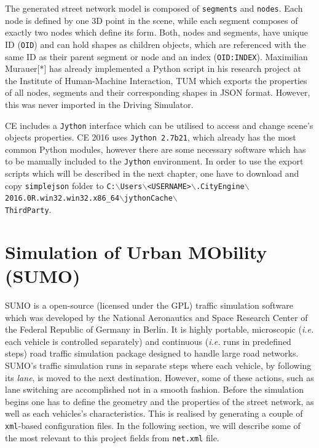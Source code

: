 The generated street network model is composed of \texttt{segments} and \texttt{nodes}. Each node is defined by one 3D point in the scene, while each segment composes of exactly two nodes which define its form. Both, nodes and segments, have unique ID (\texttt{OID}) and can hold shapes as children objects, which are referenced with the same ID as their parent segment or node and an index (\texttt{OID:INDEX}). Maximilian Murauer[*] has already implemented a Python script in his research project at the Institute of Human-Machine Interaction, TUM which exports the properties of all nodes, segments and their corresponding shapes in JSON format. However, this was never imported in the Driving Simulator.

CE includes a \texttt{Jython} interface which can be utilised to access and change scene's objects properties. CE 2016 uses \texttt{Jython 2.7b21}, which already has the most common Python modules, however there are some necessary software which has to be manually included to the \texttt{Jython} environment. In order to use the export scripts which will be described in the next chapter, one have to download and copy \texttt{simplejson} folder to \texttt{C:$\backslash$Users$\backslash$<USERNAME>$\backslash$.CityEngine$\backslash$2016.0R.win32.win32.x86\_64$\backslash$jythonCache$\backslash$\\ThirdParty}.

\section{Simulation of Urban MObility (SUMO)}
\label{ch:sumo}
SUMO is a open-source (licensed under the GPL) traffic simulation software which was developed by the National Aeronautics and Space Research Center of the Federal Republic of Germany in Berlin. It is highly portable, microscopic (\emph{i.e.} each vehicle is controlled separately) and continuous (\emph{i.e.} runs in predefined steps) road traffic simulation package designed to handle large road networks. SUMO's traffic simulation runs in separate steps where each vehicle, by following its \emph{lane}, is moved to the next destination. However, some of these actions, such as lane switching are accomplished not in a smooth fashion. Before the simulation begins one has to define the geometry and the properties of the street network, as well as each vehicles's characteristics. This is realised by generating a couple of \texttt{xml}-based configuration files. In the following section, we will describe some of the most relevant to this project fields from \texttt{net.xml} file.

